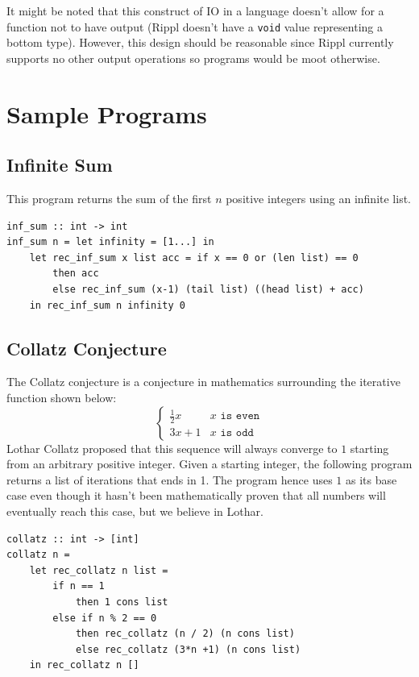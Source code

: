 \documentclass[5pt]{article}
\begin{document}
It might be noted that this construct of IO in a language doesn't allow for a function not to have output (Rippl doesn't have a \texttt{void} value representing a bottom type). However, this design should be reasonable since Rippl currently supports no other output operations so programs would be moot otherwise. \\
\section{Sample Programs}
\subsection{Infinite Sum}
This program returns the sum of the first $n$ positive integers using an 
infinite list.
\begin{lstlisting}[language=rippl]
inf_sum :: int -> int
inf_sum n = let infinity = [1...] in
    let rec_inf_sum x list acc = if x == 0 or (len list) == 0
        then acc
        else rec_inf_sum (x-1) (tail list) ((head list) + acc)
    in rec_inf_sum n infinity 0
\end{lstlisting}
\subsection{Collatz Conjecture}
The Collatz conjecture is a conjecture in mathematics surrounding the iterative 
function shown below:
$$ \begin{cases} 
      \frac{1}{2}x & x \texttt{ is even} \\
      3x + 1 & x \texttt{ is odd} 
   \end{cases}
$$
Lothar Collatz proposed that this sequence will always converge to $1$ starting 
from an arbitrary positive integer. Given a starting integer, the following 
program returns a list of iterations that ends in 1. The program hence uses $1$ 
as its base case even though it hasn't been mathematically proven that all 
numbers will eventually reach this case, but we believe in Lothar.
\begin{lstlisting}[language=rippl]
collatz :: int -> [int]
collatz n =
    let rec_collatz n list =
        if n == 1
            then 1 cons list
        else if n % 2 == 0
            then rec_collatz (n / 2) (n cons list)
            else rec_collatz (3*n +1) (n cons list)
    in rec_collatz n []
\end{lstlisting}
\end{document}

